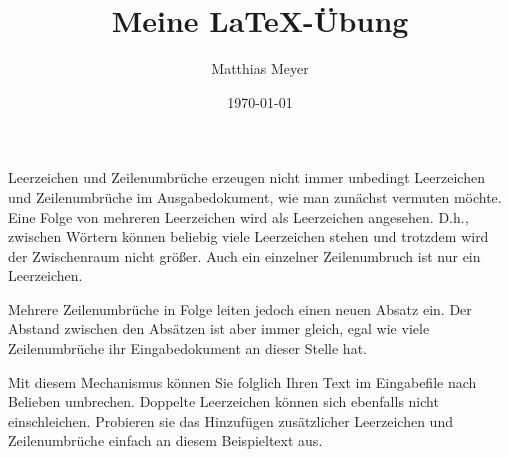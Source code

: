 \documentclass[a4paper,twoside,10pt]{article}
\author{Matthias Meyer}
\title{Meine LaTeX-Übung}
\date{\today}
\begin{document}
\maketitle
Leerzeichen und Zeilenumbrüche erzeugen nicht immer unbedingt Leerzeichen und Zeilenumbrüche im Ausgabedokument, wie man zunächst vermuten möchte. Eine Folge von mehreren Leerzeichen wird als Leerzeichen angesehen. D.h., zwischen Wörtern können beliebig viele Leerzeichen stehen und trotzdem wird der Zwischenraum nicht größer. Auch ein einzelner Zeilenumbruch ist nur ein Leerzeichen.

Mehrere Zeilenumbrüche in Folge leiten jedoch einen neuen Absatz ein. Der Abstand zwischen den Absätzen ist aber immer gleich, egal wie viele Zeilenumbrüche ihr Eingabedokument an dieser Stelle hat.

Mit diesem Mechanismus können Sie folglich Ihren Text im Eingabefile nach Belieben umbrechen. Doppelte Leerzeichen können sich ebenfalls nicht einschleichen. Probieren sie das Hinzufügen zusätzlicher Leerzeichen und Zeilenumbrüche einfach an diesem Beispieltext aus.
\end{document}
